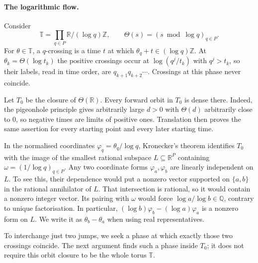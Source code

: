\paragraph{The logarithmic flow.}\label{long269:sec:flow}
Consider
\[
 \mathbb T=\prod_{q\in P}\mathbb R/(\log q)\mathbb Z,
 \qquad \Theta(s)=(s\bmod\log q)_{q\in P}.
\]
For $\theta\in\mathbb T$, a $q$-crossing is a time $t$ at which
$\theta_q+t\in(\log q)\mathbb Z$. At
$\theta_k=\Theta(\log t_k)$ the positive crossings occur at
$\log(q^j/t_k)$ with $q^j>t_k$, so their labels, read in time order, are
$q_{k+1}q_{k+2}\cdots$. Crossings at this phase never coincide.

Let $T_0$ be the closure of $\Theta(\mathbb R)$. Every forward orbit in
$T_0$ is dense there. Indeed, the pigeonhole principle gives arbitrarily
large $d>0$ with $\Theta(d)$ arbitrarily close to $0$, so negative times
are limits of positive ones. Translation then proves the same assertion
for every starting point and every later starting time.

In the normalised coordinates $\varphi_q=\theta_q/\log q$, Kronecker's
theorem identifies $T_0$ with the image of the smallest rational subspace
$L\subseteq\mathbb R^P$ containing $\omega=(1/\log q)_{q\in P}$.
Any two coordinate forms $\varphi_a,\varphi_b$ are linearly independent on
$L$. To see this, their dependence would put a nonzero vector supported
on $\{a,b\}$ in the rational annihilator of $L$. That intersection is
rational, so it would contain a nonzero integer vector. Its pairing with
$\omega$ would force $\log a/\log b\in\mathbb Q$, contrary to unique
factorisation. In particular,
$(\log b)\varphi_b-(\log a)\varphi_a$ is a nonzero form on $L$.
We write it as $\theta_b-\theta_a$ when using real representatives.

To interchange just two jumps, we seek a phase at which exactly those
two crossings coincide. The next argument finds such a phase inside
$T_0$; it does not require this orbit closure to be the whole torus
$\mathbb T$.

